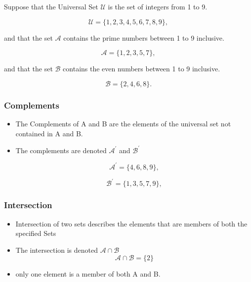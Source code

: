 Suppose that the Universal Set $\mathcal{U}$ is the set of integers from 1 to 9.

\[ \mathcal{U} = \{1,2,3,4,5,6,7,8,9\}, \]

and that the set $\mathcal{A}$ contains the prime numbers between 1 to 9 inclusive.


\[ \mathcal{A} = \{1,2,3,5,7\}, \]


and that the set $\mathcal{B}$ contains the even numbers between 1 to 9 inclusive.


\[ \mathcal{B} = \{2,4,6,8\}. \]



\subsubsection*{Complements}

\begin{itemize}


\item The Complements of A and B are the elements of the universal set not contained in A and B.


\item The complements are denoted $\mathcal{A}^{\prime}$ and $\mathcal{B}^{\prime}$

\[ \mathcal{A}^{\prime} = \{4,6,8,9\}, \]


\[ \mathcal{B}^{\prime} = \{1,3,5,7,9\}, \]


\end{itemize}






\subsubsection*{Intersection}
\begin{itemize}


\item Intersection of two sets describes the elements that are members of both the specified Sets


\item The intersection is denoted $\mathcal{A\cap B}$ 
\[ \mathcal{A\cap B} = \{2\}\]


\item only one element is a member of both A and B.

\end{itemize}

